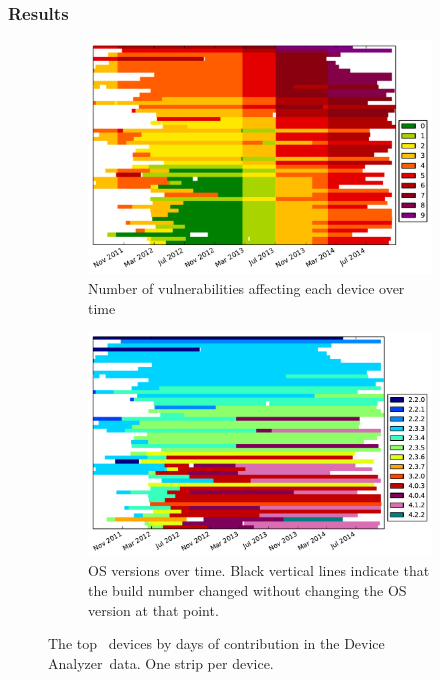 \documentclass[conference,a4paper,twoside]{IEEEtran}
\newcommand{\da}{Device Analyzer}
\begin{document}
\subsubsection{Results}
\begin{figure}
 \centering
 \begin{subfigure}[b]{\columnwidth}
  \includegraphics[width=\columnwidth]{figures/device-data-all-security}
  \caption{Number of vulnerabilities affecting each device over time}
  \label{fig:device_data_security}
 \end{subfigure}
 \begin{subfigure}[b]{\columnwidth}
  \includegraphics[width=\columnwidth]{figures/device-data-all-os}
  \caption{OS versions over time. Black vertical lines indicate that the build number changed without changing the OS version at that point.}
  \label{fig:device_data_os}
 \end{subfigure}
 \caption{The top \daNumDeviceDataDevices\ devices by days of contribution in the \da\ data. One strip per device.}
\end{figure}
\end{document}
